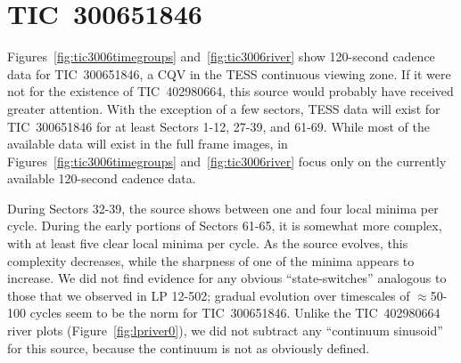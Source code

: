 \documentclass[11pt,twocolumn,tighten]{aastex63}
\begin{document}

\appendix

\section{TIC~300651846}
\label{app:tic3006}

Figures~\ref{fig:tic3006timegroups} and~\ref{fig:tic3006river} show
120-second cadence data for TIC~300651846, a CQV in the TESS
continuous viewing zone.  If it were not for the existence of
TIC~402980664, this source would probably have received greater
attention.  With the exception of a few sectors, TESS data will exist
for TIC~300651846 for at least Sectors 1-12, 27-39, and 61-69.  While
most of the available data will exist in the full frame images, in
Figures~\ref{fig:tic3006timegroups} and~\ref{fig:tic3006river} focus
only on the currently available 120-second cadence data.

During Sectors 32-39, the source shows between one and four local
minima per cycle.  During the early portions of Sectors 61-65, it is
somewhat more complex, with at least five clear local minima per
cycle.  As the source evolves, this complexity decreases, while the
sharpness of one of the minima appears to increase.  We did not find
evidence for any obvious ``state-switches'' analogous to those that we
observed in LP 12-502; gradual evolution over timescales of
$\approx$50-100 cycles seem to be the norm for TIC~300651846.  Unlike
the TIC~402980664 river plots (Figure~\ref{fig:lpriver0}), we did not
subtract any ``continuum sinusoid'' for this source, because the
continuum is not as obviously defined.

\begin{figure*}[!t]
	\begin{center}
	\end{center}
	\vspace{-0.4cm}
	\caption{
		{\bf Light curve evolution of TIC 300651846}.
    All available 120-second cadence data as of 2023 Aug 11 are shown.
    Cycles 0 to 622 span TESS Sectors 32-39 (Nov 2020--June 2021);
    cycles 2296-2676 span Sectors 61-65 (Jan--June 2023).  We assumed
    a 8.254\,hr period and a fixed reference epoch (BTJD 2174.127) for
    both panels.  Light curve segments are split based on the presence
    of gaps longer than three hours.  Cycle numbers are listed in the
    lower-right of each light curve segment.
	}
	\label{fig:tic3006timegroups}
\end{figure*}
\end{document}
